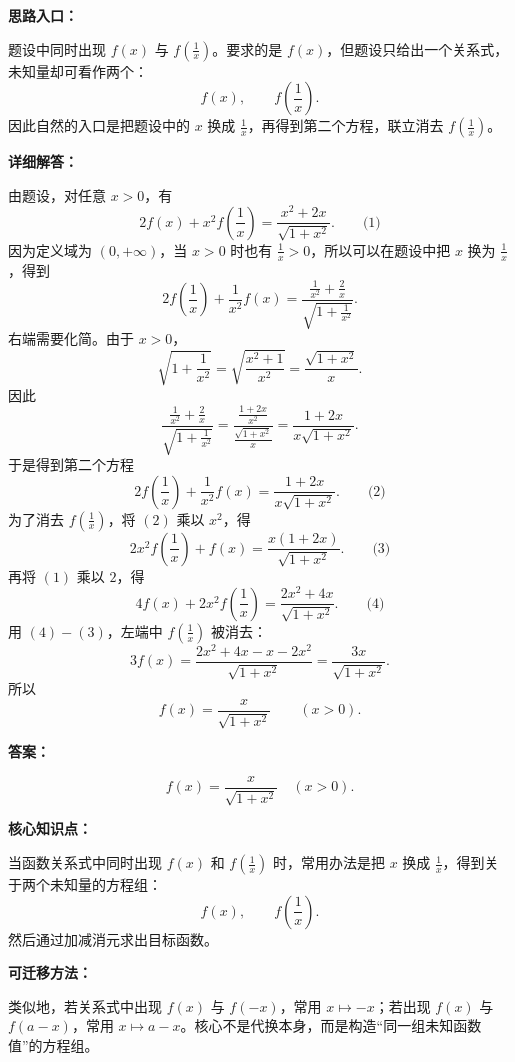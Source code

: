\begin{solutionBox}
\textbf{思路入口：}

题设中同时出现 \(f(x)\) 与 \(f\left(\frac{1}{x}\right)\)。要求的是 \(f(x)\)，但题设只给出一个关系式，未知量却可看作两个：
\[
f(x),\qquad f\left(\frac{1}{x}\right).
\]
因此自然的入口是把题设中的 \(x\) 换成 \(\frac{1}{x}\)，再得到第二个方程，联立消去 \(f\left(\frac{1}{x}\right)\)。

\textbf{详细解答：}

由题设，对任意 \(x>0\)，有
\[
2f(x)+x^2f\left(\frac{1}{x}\right)=\frac{x^2+2x}{\sqrt{1+x^2}}.
\qquad\text{(1)}
\]
因为定义域为 \((0,+\infty)\)，当 \(x>0\) 时也有 \(\frac{1}{x}>0\)，所以可以在题设中把 \(x\) 换为 \(\frac{1}{x}\)，得到
\[
2f\left(\frac{1}{x}\right)+\frac{1}{x^2}f(x)
=\frac{\frac{1}{x^2}+\frac{2}{x}}{\sqrt{1+\frac{1}{x^2}}}.
\]
右端需要化简。由于 \(x>0\)，
\[
\sqrt{1+\frac{1}{x^2}}
=\sqrt{\frac{x^2+1}{x^2}}
=\frac{\sqrt{1+x^2}}{x}.
\]
因此
\[
\frac{\frac{1}{x^2}+\frac{2}{x}}{\sqrt{1+\frac{1}{x^2}}}
=\frac{\frac{1+2x}{x^2}}{\frac{\sqrt{1+x^2}}{x}}
=\frac{1+2x}{x\sqrt{1+x^2}}.
\]
于是得到第二个方程
\[
2f\left(\frac{1}{x}\right)+\frac{1}{x^2}f(x)
=\frac{1+2x}{x\sqrt{1+x^2}}.
\qquad\text{(2)}
\]
为了消去 \(f\left(\frac{1}{x}\right)\)，将 \((2)\) 乘以 \(x^2\)，得
\[
2x^2f\left(\frac{1}{x}\right)+f(x)
=\frac{x(1+2x)}{\sqrt{1+x^2}}.
\qquad\text{(3)}
\]
再将 \((1)\) 乘以 \(2\)，得
\[
4f(x)+2x^2f\left(\frac{1}{x}\right)
=\frac{2x^2+4x}{\sqrt{1+x^2}}.
\qquad\text{(4)}
\]
用 \((4)-(3)\)，左端中 \(f\left(\frac{1}{x}\right)\) 被消去：
\[
3f(x)
=\frac{2x^2+4x-x-2x^2}{\sqrt{1+x^2}}
=\frac{3x}{\sqrt{1+x^2}}.
\]
所以
\[
f(x)=\frac{x}{\sqrt{1+x^2}}\qquad (x>0).
\]

\textbf{答案：}

\[
\boxed{f(x)=\frac{x}{\sqrt{1+x^2}}\quad (x>0)}.
\]
\end{solutionBox}

\begin{knowledgeBox}
\textbf{核心知识点：}

当函数关系式中同时出现 \(f(x)\) 和 \(f\left(\frac{1}{x}\right)\) 时，常用办法是把 \(x\) 换成 \(\frac{1}{x}\)，得到关于两个未知量的方程组：
\[
f(x),\qquad f\left(\frac{1}{x}\right).
\]
然后通过加减消元求出目标函数。

\textbf{可迁移方法：}

类似地，若关系式中出现 \(f(x)\) 与 \(f(-x)\)，常用 \(x\mapsto -x\)；若出现 \(f(x)\) 与 \(f(a-x)\)，常用 \(x\mapsto a-x\)。核心不是代换本身，而是构造“同一组未知函数值”的方程组。
\end{knowledgeBox}

